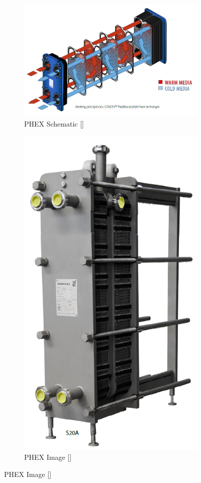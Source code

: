 \begin{figure}[H]
    \centering
    \begin{subfigure}{0.49\linewidth}
        \includegraphics[width=\linewidth]{chapters/Z-support/figures/hex_schematic.png}
        \caption{PHEX Schematic []}
    \end{subfigure}
    \begin{subfigure}{0.49\linewidth}
        \includegraphics[width=0.49\linewidth]{chapters/Z-support/figures/hex_diagram.png}
        \caption{PHEX Image []}
    \end{subfigure}
\end{figure}

